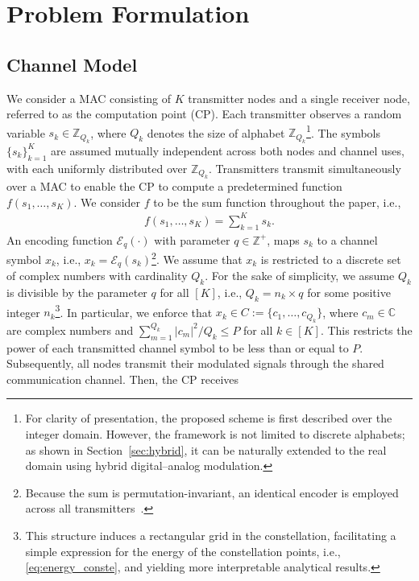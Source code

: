 \documentclass[journal,12pt,onecolumn,draftclsnofoot]{IEEEtran}
\theoremstyle{definition}
\begin{document}
\section{Problem Formulation}\label{sec:system}

\subsection{Channel Model}

We consider a MAC consisting of $K$ transmitter nodes and a single receiver node, referred to as the computation point (CP).  Each transmitter observes a random variable $s_k\in \mathbb{Z}_{Q_k}$, where $Q_k$ denotes the size of alphabet $\mathbb{Z}_{Q_k}$\footnote{For clarity of presentation, the proposed scheme is first described over the integer domain. However, the framework is not limited to discrete alphabets; as shown in Section~\ref{sec:hybrid}, it can be naturally extended to the real domain using hybrid digital–analog modulation.}.  The symbols $\{s_k\}_{k=1}^K$ are assumed mutually independent across both nodes and channel uses, with each uniformly distributed over $\mathbb{Z}_{Q_k}$. Transmitters transmit simultaneously over a MAC to enable the CP to compute a predetermined function $f(s_1,\ldots,s_K)$.  We consider $f$ to be the sum function throughout the paper, i.e.,  
\begin{align}
    f(s_1,\ldots,s_K) = \sum_{k=1}^{K}s_k. 
\end{align}
An encoding function $\mathscr{E}_q(\cdot)$ with parameter $q\in \mathbb{Z}^{+}$, maps $s_k$ to a channel symbol $x_k$, i.e., $x_k = \mathscr{E}_q(s_k)$\footnote{Because the sum is permutation-invariant, an identical encoder is employed across all transmitters~\cite{saeed2023ChannelComp}. }. We assume that $x_k$ is restricted to a discrete set of complex numbers with cardinality $Q_k$. For the sake of simplicity, we assume $Q_k$ is divisible by the parameter $q$ for all $[K]$, i.e., $Q_k= n_k \times q$ for some positive integer $n_k$\footnote{This structure induces a rectangular grid in the constellation, facilitating a simple expression for the energy of the constellation points, i.e., \eqref{eq:energy_conste}, and yielding more interpretable analytical results.}. In particular, we enforce that $x_k\in C:=\{c_1,\ldots,c_{Q_k}\}$, where $c_m \in \mathbb{C}$ are complex numbers and $\sum_{m=1}^{Q_k} |c_{m}|^2/Q_k\leq P$ for all $k\in [K]$. This restricts the power of each transmitted channel symbol to be less than or equal to $P$. Subsequently, all nodes transmit their modulated signals through the shared communication channel. Then, the CP receives  
\end{document}
